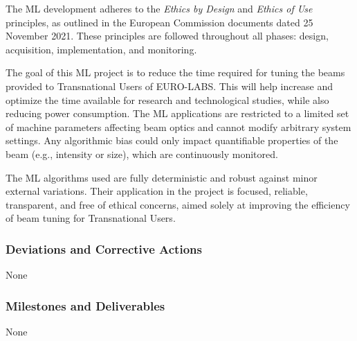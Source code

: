 The ML development adheres to the \textit{Ethics by Design} and \textit{Ethics of Use} principles, as outlined in the European Commission documents dated 25 November 2021. These principles are followed throughout all phases: design, acquisition, implementation, and monitoring.

The goal of this ML project is to reduce the time required for tuning the beams provided to Transnational Users of EURO-LABS. This will help increase and optimize the time available for research and technological studies, while also reducing power consumption.
The ML applications are restricted to a limited set of machine parameters affecting beam optics and cannot modify arbitrary system settings. Any algorithmic bias could only impact quantifiable properties of the beam (e.g., intensity or size), which are continuously monitored.

The ML algorithms used are fully deterministic and robust against minor external variations. Their application in the project is focused, reliable, transparent, and free of ethical concerns, aimed solely at improving the efficiency of beam tuning for Transnational Users.


\subsubsection*{Deviations and Corrective Actions}

None

\subsubsection*{Milestones and Deliverables}

None


